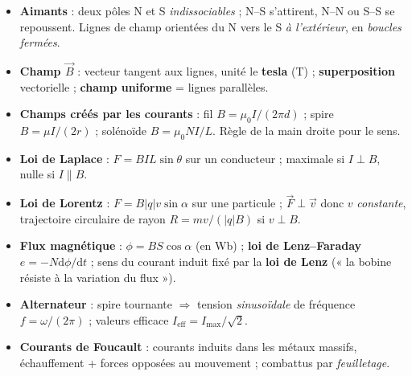 \documentclass[11pt,a4paper]{article}
\newcommand{\Bvec}{\vec{B}}
\newcommand{\Fvec}{\vec{F}}
\newcommand{\vvec}{\vec{v}}
\newcommand{\dd}{\mathrm{d}}
\begin{document}
\begin{tcolorbox}[boxbase,colback=primarydark!6,colframe=primarydark,
   title={\textsc{L'essentiel de la Fiche 11}}]
\begin{itemize}[leftmargin=1.5em,topsep=2pt,itemsep=2pt]
  \item \textbf{Aimants} : deux pôles N et S \emph{indissociables} ; N–S s'attirent, N–N ou S–S se
        repoussent. Lignes de champ orientées du N vers le S \emph{à l'extérieur}, en \emph{boucles
        fermées}.
  \item \textbf{Champ $\Bvec$} : vecteur tangent aux lignes, unité le \textbf{tesla} (T) ;
        \textbf{superposition} vectorielle ; \textbf{champ uniforme} = lignes parallèles.
  \item \textbf{Champs créés par les courants} : fil $B=\mu_0 I/(2\pi d)$ ; spire $B=\mu I/(2r)$ ;
        solénoïde $B=\mu_0 N I/L$. Règle de la main droite pour le sens.
  \item \textbf{Loi de Laplace} : $F=BIL\sin\theta$ sur un conducteur ; maximale si $I\perp B$,
        nulle si $I\parallel B$.
  \item \textbf{Loi de Lorentz} : $F=B|q|v\sin\alpha$ sur une particule ; $\Fvec\perp\vvec$ donc
        $v$ \emph{constante}, trajectoire circulaire de rayon $R=mv/(|q|B)$ si $v\perp B$.
  \item \textbf{Flux magnétique} : $\phi=BS\cos\alpha$ (en \si{\weber}) ; \textbf{loi de
        Lenz--Faraday} $e=-N\dd\phi/\dd t$ ; sens du courant induit fixé par la \textbf{loi de Lenz}
        (« la bobine résiste à la variation du flux »).
  \item \textbf{Alternateur} : spire tournante $\Rightarrow$ tension \emph{sinusoïdale} de fréquence
        $f=\omega/(2\pi)$ ; valeurs efficace $I_{\text{eff}}=I_{\max}/\sqrt{2}$.
  \item \textbf{Courants de Foucault} : courants induits dans les métaux massifs, échauffement +
        forces opposées au mouvement ; combattus par \emph{feuilletage}.
\end{itemize}
\end{tcolorbox}
\end{document}
